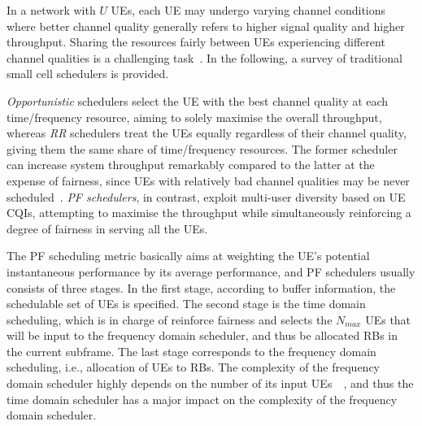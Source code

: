 \documentclass{IEEEtran}
\begin{document}
In a network with $U$ \acp{UE},
each \ac{UE} may undergo varying channel conditions
where better channel quality generally refers to higher signal quality and higher throughput.
Sharing the resources fairly between \acp{UE} experiencing different channel qualities is a challenging task~\cite{4146798}.
In the following, a survey of traditional small cell schedulers is provided.

\emph{Opportunistic} schedulers select the \ac{UE} with the best channel quality at each time/frequency resource,
aiming to solely maximise the overall throughput,
whereas \emph{\ac{RR}} schedulers treat the \acp{UE} equally regardless of their channel quality,
giving them the same share of time/frequency resources.
The former scheduler can increase system throughput remarkably compared to the latter at the expense of fairness,
since \acp{UE} with relatively bad channel qualities may be never scheduled~\cite{4489366}.
\emph{\ac{PF} schedulers}, in contrast, exploit multi-user diversity based on \ac{UE} \acp{CQI},
attempting to maximise the throughput while simultaneously reinforcing a degree of fairness in serving all the \acp{UE}.

The \ac{PF} scheduling metric basically aims at weighting the UE's potential instantaneous performance by its average performance,
and \ac{PF} schedulers usually consists of three stages.
In the first stage, according to buffer information,
the schedulable set of \acp{UE} is specified.
The second stage is the time domain scheduling,
which is in charge of reinforce fairness and selects the $N_{max}$ \acp{UE} that will be input to the frequency domain scheduler,
and thus be allocated \acp{RB} in the current subframe.
The last stage corresponds to the frequency domain scheduling,
i.e., allocation of \acp{UE} to \acp{RB}.
The complexity of the frequency domain scheduler highly depends on the number of its input \acp{UE}~\cite{4526113}~\cite{851593},
and thus the time domain scheduler has a major impact on the complexity of the frequency domain scheduler.
\end{document}
